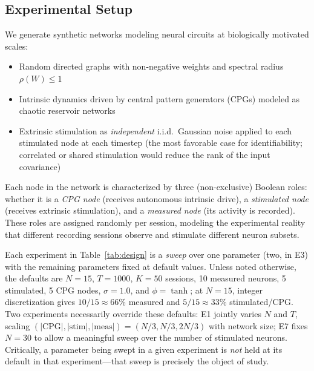 \documentclass{article}
\begin{document}
\subsection{Experimental Setup}

We generate synthetic networks modeling neural circuits at biologically motivated scales:
\begin{itemize}
    \item Random directed graphs with non-negative weights and spectral radius $\rho(W) \leq 1$
    \item Intrinsic dynamics driven by central pattern generators (CPGs) modeled as chaotic reservoir networks
    \item Extrinsic stimulation as \emph{independent} i.i.d.\ Gaussian noise applied to each stimulated node at each timestep (the most favorable case for identifiability; correlated or shared stimulation would reduce the rank of the input covariance)
\end{itemize}

Each node in the network is characterized by three (non-exclusive) Boolean roles: whether it is a \emph{CPG node} (receives autonomous intrinsic drive), a \emph{stimulated node} (receives extrinsic stimulation), and a \emph{measured node} (its activity is recorded).
These roles are assigned randomly per session, modeling the experimental reality that different recording sessions observe and stimulate different neuron subsets.

Each experiment in Table~\ref{tab:design} is a \emph{sweep} over one parameter (two, in E3) with the remaining parameters fixed at default values.
Unless noted otherwise, the defaults are $N=15$, $T=1000$, $K=50$ sessions, 10 measured neurons, 5 stimulated, 5 CPG nodes, $\sigma=1.0$, and $\phi=\tanh$; at $N=15$, integer discretization gives $10/15 \approx 66\%$ measured and $5/15 \approx 33\%$ stimulated/CPG.
Two experiments necessarily override these defaults: E1 jointly varies $N$ and $T$, scaling $(|\mathrm{CPG}|, |\mathrm{stim}|, |\mathrm{meas}|) = (N/3, N/3, 2N/3)$ with network size; E7 fixes $N=30$ to allow a meaningful sweep over the number of stimulated neurons.
Critically, a parameter being swept in a given experiment is \emph{not} held at its default in that experiment---that sweep is precisely the object of study.
\end{document}
